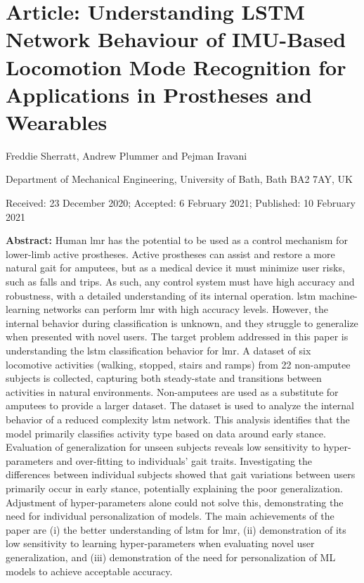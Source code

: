 \section{Article: Understanding LSTM Network Behaviour of IMU-Based Locomotion Mode Recognition for Applications in Prostheses and Wearables}

Freddie Sherratt, Andrew Plummer and Pejman Iravani

Department of Mechanical Engineering, University of Bath, Bath BA2 7AY, UK

Received: 23 December 2020; Accepted: 6 February 2021; Published: 10 February 2021

\textbf{Abstract:} Human \acrfull{lmr} has the potential to be used as a control mechanism for lower-limb active prostheses. Active prostheses can assist and restore a more natural gait for amputees, but as a medical device it must minimize user risks, such as falls and trips. As such, any control system must have high accuracy and robustness, with a detailed understanding of its internal operation. \acrfull{lstm} machine-learning networks can perform \acrshort{lmr} with high accuracy levels. However, the internal behavior during classification is unknown, and they struggle to generalize when presented with novel users. The target problem addressed in this paper is understanding the \acrshort{lstm} classification behavior for \acrshort{lmr}. A dataset of six locomotive activities (walking, stopped, stairs and ramps) from 22 non-amputee subjects is collected, capturing both steady-state and transitions between activities in natural environments. Non-amputees are used as a substitute for amputees to provide a larger dataset. The dataset is used to analyze the internal behavior of a reduced complexity \acrshort{lstm} network. This analysis identifies that the model primarily classifies activity type based on data around early stance. Evaluation of generalization for unseen subjects reveals low sensitivity to hyper-parameters and over-fitting to individuals’ gait traits. Investigating the differences between individual subjects showed that gait variations between users primarily occur in early stance, potentially explaining the poor generalization. Adjustment of hyper-parameters alone could not solve this, demonstrating the need for individual personalization of models. The main achievements of the paper are (i) the better understanding of \acrshort{lstm} for \acrshort{lmr}, (ii) demonstration of its low sensitivity to learning hyper-parameters when evaluating novel user generalization, and (iii) demonstration of the need for personalization of ML models to achieve acceptable accuracy.

